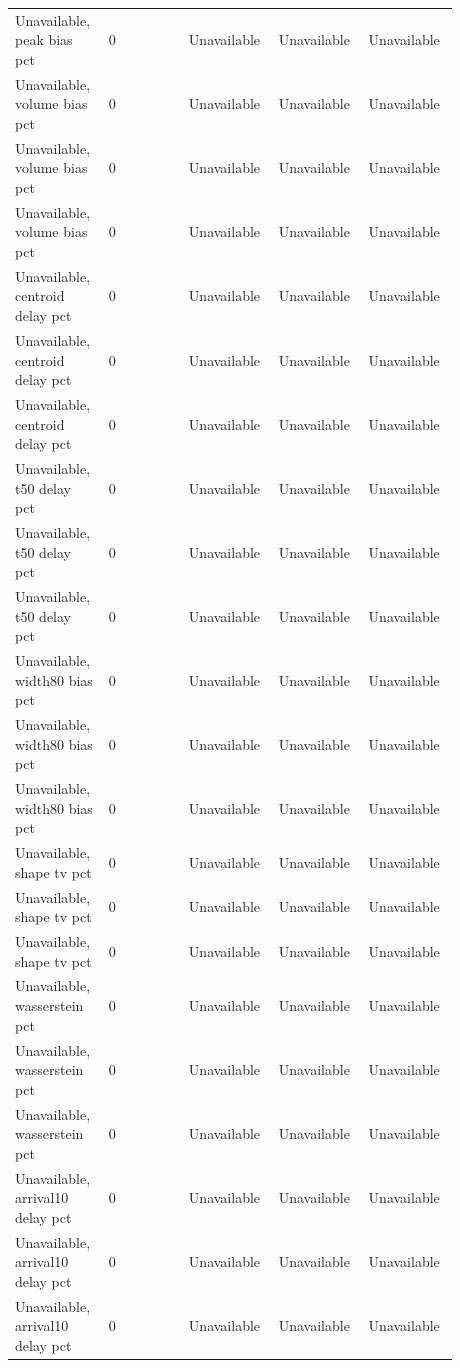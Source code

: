 \begin{longtable}{p{0.1760\linewidth}p{0.1760\linewidth}p{0.1760\linewidth}p{0.1760\linewidth}p{0.1760\linewidth}}
Unavailable, peak bias pct & 0 & Unavailable & Unavailable & Unavailable \\
Unavailable, volume bias pct & 0 & Unavailable & Unavailable & Unavailable \\
Unavailable, volume bias pct & 0 & Unavailable & Unavailable & Unavailable \\
Unavailable, volume bias pct & 0 & Unavailable & Unavailable & Unavailable \\
Unavailable, centroid delay pct & 0 & Unavailable & Unavailable & Unavailable \\
Unavailable, centroid delay pct & 0 & Unavailable & Unavailable & Unavailable \\
Unavailable, centroid delay pct & 0 & Unavailable & Unavailable & Unavailable \\
Unavailable, t50 delay pct & 0 & Unavailable & Unavailable & Unavailable \\
Unavailable, t50 delay pct & 0 & Unavailable & Unavailable & Unavailable \\
Unavailable, t50 delay pct & 0 & Unavailable & Unavailable & Unavailable \\
Unavailable, width80 bias pct & 0 & Unavailable & Unavailable & Unavailable \\
Unavailable, width80 bias pct & 0 & Unavailable & Unavailable & Unavailable \\
Unavailable, width80 bias pct & 0 & Unavailable & Unavailable & Unavailable \\
Unavailable, shape tv pct & 0 & Unavailable & Unavailable & Unavailable \\
Unavailable, shape tv pct & 0 & Unavailable & Unavailable & Unavailable \\
Unavailable, shape tv pct & 0 & Unavailable & Unavailable & Unavailable \\
Unavailable, wasserstein pct & 0 & Unavailable & Unavailable & Unavailable \\
Unavailable, wasserstein pct & 0 & Unavailable & Unavailable & Unavailable \\
Unavailable, wasserstein pct & 0 & Unavailable & Unavailable & Unavailable \\
Unavailable, arrival10 delay pct & 0 & Unavailable & Unavailable & Unavailable \\
Unavailable, arrival10 delay pct & 0 & Unavailable & Unavailable & Unavailable \\
Unavailable, arrival10 delay pct & 0 & Unavailable & Unavailable & Unavailable \\

\end{longtable}
